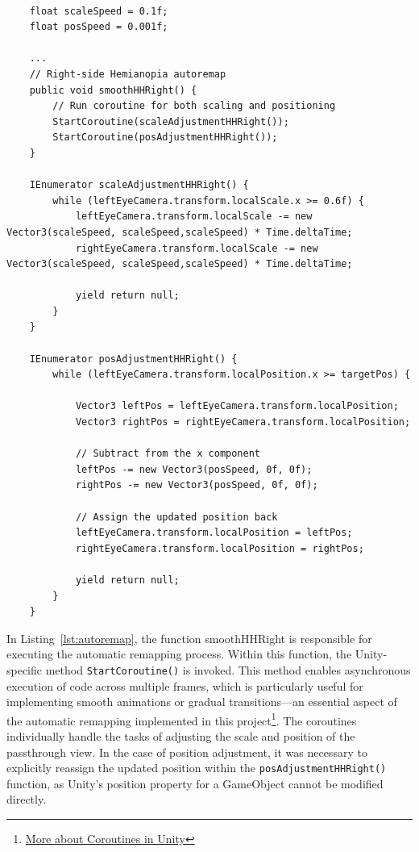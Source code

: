 \documentclass{l4proj}
\begin{document}
\begin{lstlisting}[language={[Sharp]C}, float, caption={An excerpt of the automatic remapping script for one of the preset conditions}, label=lst:autoremap]
    
    float scaleSpeed = 0.1f;
    float posSpeed = 0.001f;
    
    ...
    // Right-side Hemianopia autoremap
    public void smoothHHRight() {
        // Run coroutine for both scaling and positioning
        StartCoroutine(scaleAdjustmentHHRight());
        StartCoroutine(posAdjustmentHHRight());
    }

    IEnumerator scaleAdjustmentHHRight() {
        while (leftEyeCamera.transform.localScale.x >= 0.6f) {
            leftEyeCamera.transform.localScale -= new Vector3(scaleSpeed, scaleSpeed,scaleSpeed) * Time.deltaTime;
            rightEyeCamera.transform.localScale -= new Vector3(scaleSpeed, scaleSpeed,scaleSpeed) * Time.deltaTime;

            yield return null;
        }
    }

    IEnumerator posAdjustmentHHRight() {
        while (leftEyeCamera.transform.localPosition.x >= targetPos) {

            Vector3 leftPos = leftEyeCamera.transform.localPosition;
            Vector3 rightPos = rightEyeCamera.transform.localPosition;

            // Subtract from the x component
            leftPos -= new Vector3(posSpeed, 0f, 0f);
            rightPos -= new Vector3(posSpeed, 0f, 0f);

            // Assign the updated position back
            leftEyeCamera.transform.localPosition = leftPos;
            rightEyeCamera.transform.localPosition = rightPos;

            yield return null;
        }
    }

\end{lstlisting}

In Listing~\ref{lst:autoremap}, the function smoothHHRight is responsible for executing the automatic remapping process. Within this function, the Unity-specific method \texttt{StartCoroutine()} is invoked. This method enables asynchronous execution of code across multiple frames, which is particularly useful for implementing smooth animations or gradual transitions—an essential aspect of the automatic remapping implemented in this project\footnote{\href{https://docs.unity3d.com/6000.0/Documentation/Manual/coroutines.html}{More about Coroutines in Unity}}. The coroutines individually handle the tasks of adjusting the scale and position of the passthrough view. In the case of position adjustment, it was necessary to explicitly reassign the updated position within the \texttt{posAdjustmentHHRight()} function, as Unity's position property for a GameObject cannot be modified directly.
\end{document}
